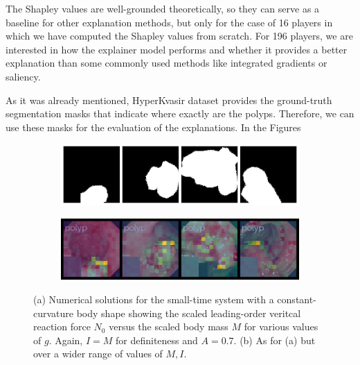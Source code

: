 \documentclass[magisterska,en]{pracamgr}
\begin{document}
The Shapley values are well-grounded theoretically, so they can serve as a baseline for other explanation methods, but only for the case of 16 players in which we have computed the Shapley values from scratch. For 196 players, we are interested in how the explainer model performs and whether it provides a better explanation than some commonly used methods like integrated gradients or saliency.





As it was already mentioned, HyperKvasir dataset provides the ground-truth segmentation masks that indicate where exactly are the polyps. Therefore, we can use these masks for the evaluation of the explanations. In the Figures 




\begin{figure}
\centering
\begin{subfigure}[b]{0.55\textwidth}
   \includegraphics[width=1\linewidth]{./images/gastro_segmentation_1.png}
   \caption{}
   \label{fig:Ng1} 
\end{subfigure}

\begin{subfigure}[b]{0.55\textwidth}
   \includegraphics[width=1\linewidth]{./images/gastro_shap_for_segm_1.png}
   \caption{}
   \label{fig:Ng2}
\end{subfigure}

\caption[Two numerical solutions]{(a) Numerical solutions for the small-time system 
with a constant-curvature body shape showing the scaled leading-order veritcal 
reaction force $N_0$ versus the scaled body mass $M$ for various values of $g$. 
Again, $I=M$ for definiteness and $A=0.7$. (b) As for (a) but over a wider range of 
values of $M,I$.}
\end{figure}
\end{document}

